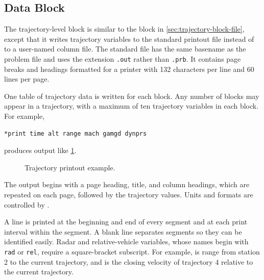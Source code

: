 \subsection{ Data Block}\label{sec:trajectory-block-print}

The trajectory-level  block is similar to the
 block in \cref{sec:trajectory-block-file}, except that it
writes trajectory variables to the standard printout file instead of to a user-named
column file. The standard file has the same basename as the problem file and uses the
extension \texttt{.out} rather than \texttt{.prb}. It contains page breaks and
headings formatted for a printer with 132 characters per line and 60 lines per page.

One table of trajectory data is written for each  block. Any
number of blocks may appear in a trajectory, with a maximum of ten trajectory
variables in each block. For example,

\begin{lstlisting}[style=taosmanual]
*print time alt range mach gamgd dynprs
\end{lstlisting}

produces output like \cref{fig:trajectory-printout-example}.

\begin{figure}[htbp]
  \centering
  \begin{minipage}{0.96\linewidth}
    
  \end{minipage}
  \caption{Trajectory printout example.}
  \label{fig:trajectory-printout-example}
\end{figure}

The output begins with a page heading, title, and column headings, which are
repeated on each page, followed by the trajectory values. Units and formats are
controlled by .

A line is printed at the beginning and end of every segment and at each print interval
within the segment. A blank line separates segments so they can be identified easily.
Radar and relative-vehicle variables, whose names begin with \texttt{rad} or
\texttt{rel}, require a square-bracket subscript. For example,
 is range from station 2 to the current trajectory, and
 is the closing velocity of trajectory 4 relative to the current
trajectory.
